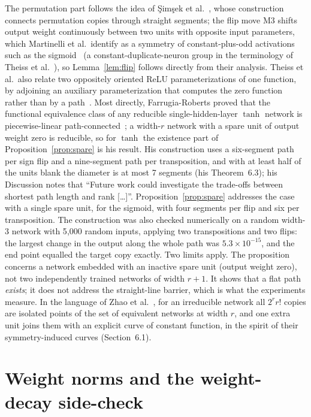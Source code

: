\documentclass[11pt]{article}
\begin{document}
The permutation part follows the idea of Şimşek et al.~\cite{simsek2021geometry}, whose construction connects permutation copies through straight segments; the flip move M3 shifts output weight continuously between two units with opposite input parameters, which Martinelli et al.\ identify as a symmetry of constant-plus-odd activations such as the sigmoid~\cite[Appendix~A.2.2]{martinelli2024expand} (a constant-duplicate-neuron group in the terminology of Theiss et al.~\cite[Definition~B.12]{theiss2026parameter}), so Lemma~\ref{lem:flip} follows directly from their analysis. Theiss et al.\ also relate two oppositely oriented ReLU parameterizations of one function, by adjoining an auxiliary parameterization that computes the zero function rather than by a path~\cite[Example~B.13]{theiss2026parameter}. Most directly, Farrugia-Roberts proved that the functional equivalence class of any reducible single-hidden-layer $\tanh$ network is piecewise-linear path-connected~\cite[Theorem~6.1]{farrugia2023functional}; a width-$r$ network with a spare unit of output weight zero is reducible, so for $\tanh$ the existence part of Proposition~\ref{prop:spare} is his result. His construction uses a six-segment path per sign flip and a nine-segment path per transposition, and with at least half of the units blank the diameter is at most 7 segments (his Theorem~6.3); his Discussion notes that ``Future work could investigate the trade-offs between shortest path length and rank [\dots]''. Proposition~\ref{prop:spare} addresses the case with a single spare unit, for the sigmoid, with four segments per flip and six per transposition. The construction was also checked numerically on a random width-3 network with 5{,}000 random inputs, applying two transpositions and two flips: the largest change in the output along the whole path was $5.3\times10^{-15}$, and the end point equalled the target copy exactly. Two limits apply. The proposition concerns a network embedded with an inactive spare unit (output weight zero), not two independently trained networks of width $r+1$. It shows that a flat path \emph{exists}; it does not address the straight-line barrier, which is what the experiments measure. In the language of Zhao et al.~\cite{zhao2025understanding}, for an irreducible network all $2^r r!$ copies are isolated points of the set of equivalent networks at width $r$, and one extra unit joins them with an explicit curve of constant function, in the spirit of their symmetry-induced curves (Section~6.1).


\section{Weight norms and the weight-decay side-check}
\end{document}
